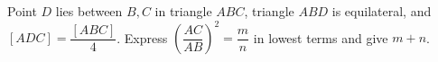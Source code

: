 Point $D$ lies between $B,C$ in triangle $ABC$, triangle $ABD$ is equilateral, and $[ADC]=\dfrac{[ABC]}{4}$. Express $(\dfrac{AC}{AB})^2=\dfrac{m}{n}$ in lowest terms and give $m+n$.
